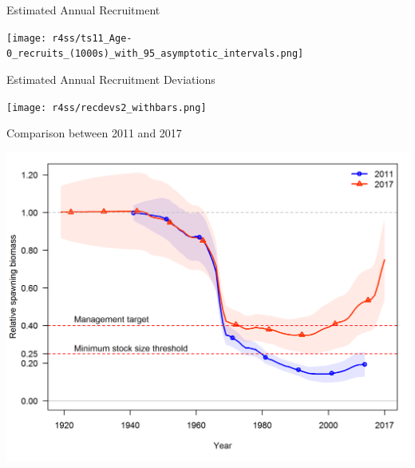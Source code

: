 \documentclass[pdf]{beamer}\usepackage[]{graphicx}\usepackage[]{color}
\begin{document}
\begin{frame}{Estimated Annual Recruitment}
  \begin{center}
    \texttt{[image: r4ss/ts11\_Age-0\_recruits\_(1000s)\_with\_95\_asymptotic\_intervals.png]}
  \end{center}
\end{frame}

\begin{frame}{Estimated Annual Recruitment Deviations}
  \begin{center}
    \texttt{[image: r4ss/recdevs2\_withbars.png]}
  \end{center}
\end{frame}

\begin{frame}{Comparison between 2011 and 2017}
  \begin{center}
    \includegraphics[scale = 0.50]{figures/2011_2017_Bratio.png}
  \end{center}
\end{frame}
\end{document}
